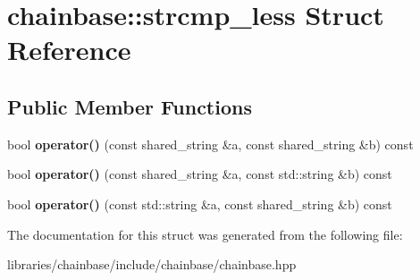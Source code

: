\hypertarget{structchainbase_1_1strcmp__less}{}\section{chainbase\+:\+:strcmp\+\_\+less Struct Reference}
\label{structchainbase_1_1strcmp__less}
\subsection*{Public Member Functions}
\begin{DoxyCompactItemize}
\item 
\mbox{\label{structchainbase_1_1strcmp__less_aab388f9a946d235a724a65a6e9f16172}} 
bool {\bfseries operator()} (const shared\+\_\+string \&a, const shared\+\_\+string \&b) const
\item 
\mbox{\label{structchainbase_1_1strcmp__less_a5a826f3a5b04ae3d42f411a9a8566ec2}} 
bool {\bfseries operator()} (const shared\+\_\+string \&a, const std\+::string \&b) const
\item 
\mbox{\label{structchainbase_1_1strcmp__less_ac71183cd1cf7de14e52ab85eaf14610a}} 
bool {\bfseries operator()} (const std\+::string \&a, const shared\+\_\+string \&b) const
\end{DoxyCompactItemize}


The documentation for this struct was generated from the following file\+:\begin{DoxyCompactItemize}
\item 
libraries/chainbase/include/chainbase/chainbase.\+hpp\end{DoxyCompactItemize}
